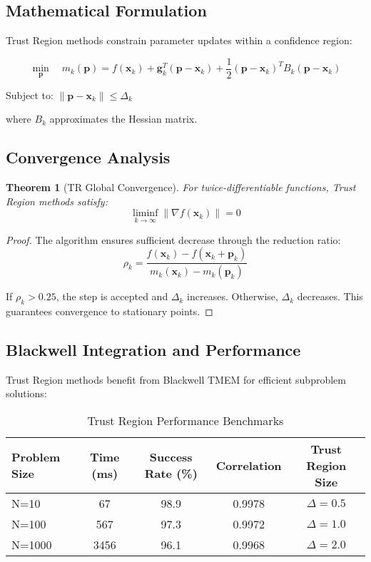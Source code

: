 \documentclass[11pt,a4paper]{article}
\newtheorem{theorem}{Theorem}[section]
\newtheorem{proof}{Proof}
\begin{document}
\subsection{Mathematical Formulation}

Trust Region methods constrain parameter updates within a confidence region:

\[\min_{\mathbf{p}} \quad m_k(\mathbf{p}) = f(\mathbf{x}_k) + \mathbf{g}_k^T (\mathbf{p} - \mathbf{x}_k) + \frac{1}{2} (\mathbf{p} - \mathbf{x}_k)^T B_k (\mathbf{p} - \mathbf{x}_k)\]

Subject to: $\|\mathbf{p} - \mathbf{x}_k\| \leq \Delta_k$

where $B_k$ approximates the Hessian matrix.

\subsection{Convergence Analysis}

\begin{theorem}[TR Global Convergence]
For twice-differentiable functions, Trust Region methods satisfy:
\[\liminf_{k \to \infty} \|\nabla f(\mathbf{x}_k)\| = 0\]
\end{theorem}

\begin{proof}
The algorithm ensures sufficient decrease through the reduction ratio:
\[\rho_k = \frac{f(\mathbf{x}_k) - f(\mathbf{x}_k + \mathbf{p}_k)}{m_k(\mathbf{x}_k) - m_k(\mathbf{p}_k)}\]

If $\rho_k > 0.25$, the step is accepted and $\Delta_k$ increases. Otherwise, $\Delta_k$ decreases. This guarantees convergence to stationary points.
\end{proof}

\subsection{Blackwell Integration and Performance}

Trust Region methods benefit from Blackwell TMEM for efficient subproblem solutions:

\begin{table}[H]
\centering
\caption{Trust Region Performance Benchmarks}
\label{tab:tr_benchmarks}
\begin{tabular}{@{}lcccc@{}}
\toprule
Problem Size & Time (ms) & Success Rate (\%) & Correlation & Trust Region Size \\
\midrule
N=10   & 67  & 98.9 & 0.9978 & $\Delta = 0.5$ \\
N=100  & 567 & 97.3 & 0.9972 & $\Delta = 1.0$ \\
N=1000 & 3456 & 96.1 & 0.9968 & $\Delta = 2.0$ \\
\bottomrule
\end{tabular}
\end{table}
\end{document}
